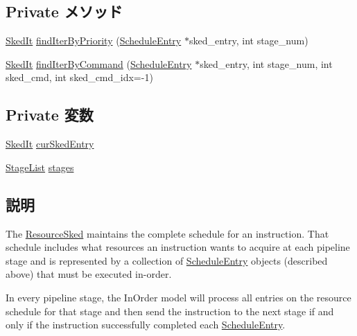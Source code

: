 \subsection*{Private メソッド}
\begin{DoxyCompactItemize}
\item 
\hyperlink{classResourceSked_ab2a9eec675af76477619cacd99ea5225}{SkedIt} \hyperlink{classResourceSked_ae8e8d099790bc4d1c165f44c4cc031e3}{findIterByPriority} (\hyperlink{classScheduleEntry}{ScheduleEntry} $\ast$sked\_\-entry, int stage\_\-num)
\item 
\hyperlink{classResourceSked_ab2a9eec675af76477619cacd99ea5225}{SkedIt} \hyperlink{classResourceSked_a0227e29ef6102c3bf012bd8ef5b53b88}{findIterByCommand} (\hyperlink{classScheduleEntry}{ScheduleEntry} $\ast$sked\_\-entry, int stage\_\-num, int sked\_\-cmd, int sked\_\-cmd\_\-idx=-\/1)
\end{DoxyCompactItemize}
\subsection*{Private 変数}
\begin{DoxyCompactItemize}
\item 
\hyperlink{classResourceSked_ab2a9eec675af76477619cacd99ea5225}{SkedIt} \hyperlink{classResourceSked_a776f518c901720e43d62f12f8d1cad70}{curSkedEntry}
\item 
\hyperlink{classstd_1_1vector}{StageList} \hyperlink{classResourceSked_aacb3efd7714ef0cabf149e417086ad56}{stages}
\end{DoxyCompactItemize}


\subsection{説明}
The \hyperlink{classResourceSked}{ResourceSked} maintains the complete schedule for an instruction. That schedule includes what resources an instruction wants to acquire at each pipeline stage and is represented by a collection of \hyperlink{classScheduleEntry}{ScheduleEntry} objects (described above) that must be executed in-\/order.

In every pipeline stage, the InOrder model will process all entries on the resource schedule for that stage and then send the instruction to the next stage if and only if the instruction successfully completed each \hyperlink{classScheduleEntry}{ScheduleEntry}. 

